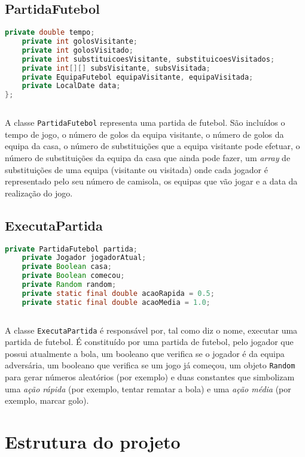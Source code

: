 \documentclass[a4paper]{report}
\begin{document}
	\section{PartidaFutebol}
	\begin{lstlisting}[language=Java]
    private double tempo;
    private int golosVisitante;
    private int golosVisitado;
    private int substituicoesVisitante, substituicoesVisitados;
    private int[][] subsVisitante, subsVisitada;
    private EquipaFutebol equipaVisitante, equipaVisitada;
    private LocalDate data;
};
   
	\end{lstlisting}
    A classe \texttt{PartidaFutebol} representa uma partida de futebol. São incluídos o tempo de jogo, o número de golos da equipa visitante, o número de golos da equipa da casa, o número de substituições que a equipa visitante pode efetuar, o número de substituições da equipa da casa que ainda pode fazer, um \textit{array} de substituições de uma equipa (visitante ou visitada) onde cada jogador é representado
    pelo seu número de camisola, os equipas que vão jogar e a data da realização do jogo.
	  
		\section{ExecutaPartida}
	\begin{lstlisting}[language=Java]
    private PartidaFutebol partida;
    private Jogador jogadorAtual;
    private Boolean casa; 
    private Boolean comecou;
    private Random random;
    private static final double acaoRapida = 0.5;
    private static final double acaoMedia = 1.0;
	
	\end{lstlisting}
		A classe \texttt{ExecutaPartida} é responsável por, tal como diz o nome, executar uma partida de futebol.
		É constituído por uma partida de futebol, pelo jogador que possui atualmente a bola, um booleano que verifica se o jogador é da equipa adversária, um booleano que verifica se um jogo já começou, um objeto \texttt{Random} para gerar números aleatórios (por exemplo) e duas constantes que simbolizam uma \textit{ação rápida} (por exemplo, tentar rematar a bola) e uma \textit{ação média} (por exemplo, marcar golo).
		

	\chapter{Estrutura do projeto}
	
\end{document}
